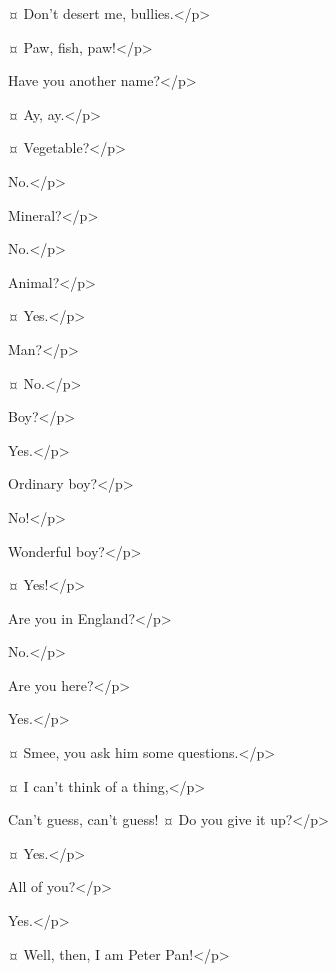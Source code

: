 \hookspeaks {}¤
Don't desert me, bullies.</p>

\peterspeaks {}¤
Paw, fish, paw!</p>


\hookspeaks
Have you another name?</p>

\peterspeaks {}¤
Ay, ay.</p>

\hookspeaks {}¤
Vegetable?</p>

\peterspeaks
No.</p>

\hookspeaks
Mineral?</p>

\peterspeaks
No.</p>

\hookspeaks
Animal?</p>

\peterspeaks {}¤
Yes.</p>

\hookspeaks
Man?</p>

\peterspeaks {}¤
No.</p>

\hookspeaks
Boy?</p>

\peterspeaks
Yes.</p>

\hookspeaks
Ordinary boy?</p>

\peterspeaks
No!</p>

\hookspeaks
Wonderful boy?</p>

\peterspeaks {}¤
Yes!</p>

\hookspeaks
Are you in England?</p>

\peterspeaks
No.</p>

\hookspeaks
Are you here?</p>

\peterspeaks
Yes.</p>

\hookspeaks {}¤
Smee, you ask him some questions.</p>

\smeespeaks {}¤
I can't think of a thing,</p>

\peterspeaks
Can't guess, can't guess!
¤
Do you give it up?</p>

\hookspeaks {}¤
Yes.</p>

\peterspeaks
All of you?</p>

Yes.</p>

\peterspeaks {}¤
Well, then, I am Peter Pan!</p>

